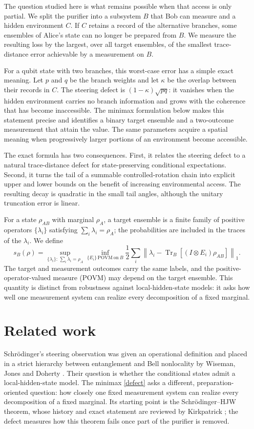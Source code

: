 \documentclass[11pt,a4paper]{article}
\theoremstyle{definition}
\theoremstyle{plain}
\DeclareMathOperator{\Tr}{Tr}
\newcommand{\norm}[1]{\left\lVert#1\right\rVert}
\begin{document}
The question studied here is what remains possible when that access is only
partial. We split the purifier into a subsystem $B$ that Bob can measure and a
hidden environment $C$. If $C$ retains a record of the alternative branches,
some ensembles of Alice's state can no longer be prepared from $B$. We measure
the resulting loss by the largest, over all target ensembles, of the smallest
trace-distance error achievable by a measurement on $B$.

For a qubit state with two branches, this worst-case error has a simple exact
meaning. Let $p$ and $q$ be the branch weights and let $\kappa$ be the overlap
between their records in $C$. The steering defect is
$(1-\kappa)\sqrt{pq}$: it vanishes when the hidden environment carries no
branch information and grows with the coherence that has become inaccessible.
The minimax formulation below makes this statement precise and identifies a
binary target ensemble and a two-outcome measurement that attain the value.
The same parameters acquire a spatial meaning when progressively larger
portions of an environment become accessible.

The exact formula has two consequences. First, it relates the steering defect
to a natural trace-distance defect for state-preserving conditional
expectations. Second, it turns the tail of a summable controlled-rotation
chain into explicit upper and lower bounds on the benefit of increasing
environmental access. The resulting decay is quadratic in the small tail
angles, although the unitary truncation error is linear.

For a state $\rho_{AB}$ with marginal $\rho_A$, a target ensemble is a finite
family of positive operators $\{\lambda_i\}$ satisfying
$\sum_i\lambda_i=\rho_A$; the probabilities are included in the traces of the
$\lambda_i$. We define
\begin{equation}\label{defect}
s_B(\rho)=\sup_{\{\lambda_i\}:\,\sum_i\lambda_i=\rho_A}
\inf_{\{E_i\}\,\mathrm{POVM\ on}\ B}
\frac12\sum_i\norm{\lambda_i-\Tr_B[(I\otimes E_i)\rho_{AB}]}_1.
\end{equation}
The target and measurement outcomes carry the same labels, and the
positive-operator-valued measure (POVM) may depend on the target ensemble.
This quantity is distinct from robustness against local-hidden-state models:
it asks how well one measurement system can realize every decomposition of a
fixed marginal.

\section{Related work}
Schr\"odinger's steering observation was given an operational definition and
placed in a strict hierarchy between entanglement and Bell nonlocality by
Wiseman, Jones and Doherty \cite{Wiseman}. Their question is whether the
conditional states admit a local-hidden-state model. The minimax
\eqref{defect} asks a different, preparation-oriented question: how closely
one fixed measurement system can realize every decomposition of a fixed
marginal. Its starting point is the Schr\"odinger--HJW theorem, whose history
and exact statement are reviewed by Kirkpatrick \cite{Kirkpatrick}; the
defect measures how this theorem fails once part of the purifier is removed.
\end{document}
